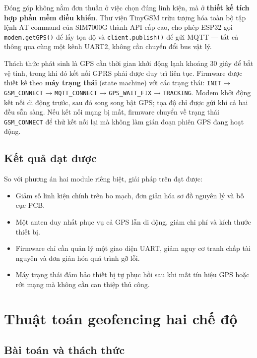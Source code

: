 \documentclass[../DoAn.tex]{subfiles}
\begin{document}
Đóng góp không nằm đơn thuần ở việc chọn đúng linh kiện, mà ở \textbf{thiết kế tích hợp phần mềm điều khiển}. Thư viện TinyGSM trừu tượng hóa toàn bộ tập lệnh AT command của SIM7000G thành API cấp cao, cho phép ESP32 gọi \texttt{modem.getGPS()} để lấy tọa độ và \texttt{client.publish()} để gửi MQTT — tất cả thông qua cùng một kênh UART2, không cần chuyển đổi bus vật lý.

Thách thức phát sinh là GPS cần thời gian khởi động lạnh khoảng 30 giây để bắt vệ tinh, trong khi đó kết nối GPRS phải được duy trì liên tục. Firmware được thiết kế theo \textbf{máy trạng thái} (state machine) với các trạng thái: \texttt{INIT} → \texttt{GSM\_CONNECT} → \texttt{MQTT\_CONNECT} → \texttt{GPS\_WAIT\_FIX} → \texttt{TRACKING}. Modem khởi động kết nối di động trước, sau đó song song bật GPS; tọa độ chỉ được gửi khi cả hai đều sẵn sàng. Nếu kết nối mạng bị mất, firmware chuyển về trạng thái \texttt{GSM\_CONNECT} để thử kết nối lại mà không làm gián đoạn phiên GPS đang hoạt động.

\subsection{Kết quả đạt được}

So với phương án hai module riêng biệt, giải pháp trên đạt được:
\begin{itemize}
    \item Giảm số linh kiện chính trên bo mạch, đơn giản hóa sơ đồ nguyên lý và bố cục PCB.
    \item Một anten duy nhất phục vụ cả GPS lẫn di động, giảm chi phí và kích thước thiết bị.
    \item Firmware chỉ cần quản lý một giao diện UART, giảm nguy cơ tranh chấp tài nguyên và đơn giản hóa quá trình gỡ lỗi.
    \item Máy trạng thái đảm bảo thiết bị tự phục hồi sau khi mất tín hiệu GPS hoặc rớt mạng mà không cần can thiệp thủ công.
\end{itemize}

\section{Thuật toán geofencing hai chế độ}
\label{section:5.2}

\subsection{Bài toán và thách thức}
\end{document}

